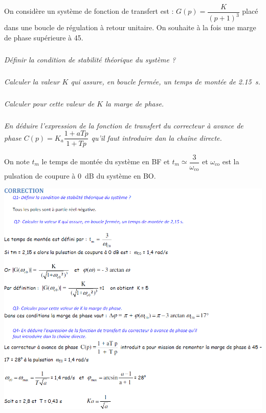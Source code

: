 \documentclass[10pt,fleqn]{article} %
\begin{document}

\vspace{5cm}
\pagestyle{fancy}
\thispagestyle{plain}

\def\columnseprulecolor{\color{ocre}}
\setlength{\columnseprule}{0.4pt} 

\def\pathfig{images}

\begin{multicols}{2}




On considère un système de fonction de transfert est :  $G(p)=\dfrac{K}{(p+1)^3}$ placé dans une boucle de régulation à retour unitaire. On souhaite à la fois une marge de phase supérieure à 45\degres.

\subparagraph{}
\textit{Définir la condition de stabilité théorique du système ? }

\subparagraph{}
\textit{Calculer la valeur $K$ qui assure, en boucle fermée, un temps de montée de \SI{2,15}{s}.}

\subparagraph{}
\textit{Calculer pour cette valeur de $K$ la marge de phase.}

\subparagraph{}
\textit{En déduire l'expression de la fonction de transfert du correcteur à avance de phase $C(p)=K_a\dfrac{1+aTp}{1+Tp}$ qu'il faut introduire dan la chaîne directe.  }



On note $t_m$ le temps de montée du système en BF et $t_m\simeq \dfrac{3}{\omega_{\text{co}}}$ et $\omega_{\text{co}}$ est la pulsation de coupure à \SI{0}{dB} du système en BO.  


\end{multicols}
\newpage
\begin{center}
\includegraphics[width=\linewidth]{images/cor_01}

\end{center}
\end{document}
